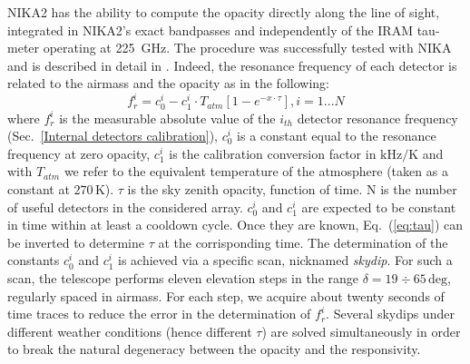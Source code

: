 \documentclass[]{aa} %
\begin{document}
NIKA2 has the ability to compute the opacity directly along the line of sight, integrated in NIKA2's exact bandpasses and independently of the IRAM tau-meter operating at 225~GHz. The procedure was successfully tested with NIKA and is described in detail in \cite{Catalano2014}. Indeed, the resonance frequency of each detector is related to the airmass and the opacity as in the following:
\begin{equation}\label{eq:skydip}
f^{i}_{r} = c^{i}_0 - c^{i}_1 \cdot T_{atm}[1 - e^{- x \cdot \tau}],  i = 1 ... N
\label{eq:tau}
\end{equation}
where $f^{i}_{r}$ is the measurable absolute value of the $i_{th}$ detector resonance frequency (Sec.~\ref{Internal detectors calibration}), $c^{i}_0$ is a constant equal to the resonance frequency at zero opacity, $c^{i}_1$ is the calibration conversion factor in $\mathrm{kHz/K}$ and with $T_{atm}$ we refer to the equivalent temperature of the atmosphere (taken as a constant at $270\,\mathrm{K}$). $\tau$ is the sky zenith opacity, function of time. N is the number of useful detectors in the considered array. $c^{i}_0$ and $c^{i}_1$ are expected to be constant in time within at least a cooldown cycle. Once they are known, Eq.~(\ref{eq:tau}) can be inverted to determine $\tau$ at the corrisponding time. The determination of the constants $c^{i}_0$ and $c^{i}_1$ is achieved via a specific scan, nicknamed \emph{skydip}. For such a scan, the telescope performs eleven elevation steps in the range $\delta = 19\div65\,\mathrm{deg}$, regularly spaced in airmass. For each step, we acquire about twenty seconds of time traces to reduce the error in the determination of $f^{i}_{r}$. Several skydips under different weather conditions (hence different $\tau$) are solved simultaneously in order to break the natural degeneracy between the opacity and the responsivity.
\end{document}

